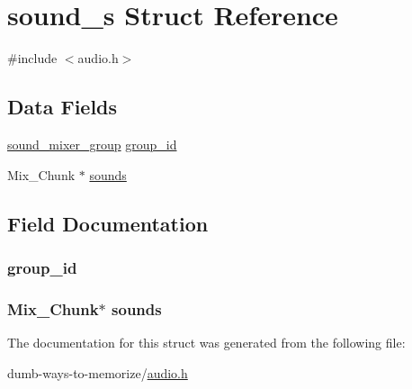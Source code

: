 \hypertarget{structsound__s}{}\section{sound\+\_\+s Struct Reference}
\label{structsound__s}


{\ttfamily \#include $<$audio.\+h$>$}

\subsection*{Data Fields}
\begin{DoxyCompactItemize}
\item 
\hyperlink{audio_8h_aefd8a54164d8e94ab23d6e2325d31d62}{sound\+\_\+mixer\+\_\+group} \hyperlink{structsound__s_a48f8c3bfb8f583f6b01b6d98a4c1b76e}{group\+\_\+id}
\item 
Mix\+\_\+\+Chunk $\ast$ \hyperlink{structsound__s_a6d93e5d3ad0129fe52153ecacc4f162a}{sounds}
\end{DoxyCompactItemize}


\subsection{Field Documentation}
\subsubsection[{\texorpdfstring{group\+\_\+id}{group_id}}]{ group\+\_\+id}\hypertarget{structsound__s_a48f8c3bfb8f583f6b01b6d98a4c1b76e}{}\label{structsound__s_a48f8c3bfb8f583f6b01b6d98a4c1b76e}
\subsubsection[{\texorpdfstring{sounds}{sounds}}]{\setlength{\rightskip}{0pt plus 5cm}Mix\+\_\+\+Chunk$\ast$ sounds}\hypertarget{structsound__s_a6d93e5d3ad0129fe52153ecacc4f162a}{}\label{structsound__s_a6d93e5d3ad0129fe52153ecacc4f162a}


The documentation for this struct was generated from the following file\+:\begin{DoxyCompactItemize}
\item 
dumb-\/ways-\/to-\/memorize/\hyperlink{audio_8h}{audio.\+h}\end{DoxyCompactItemize}
